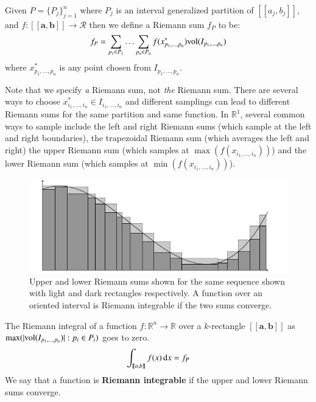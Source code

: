 \begin{definition}
	Given $P=\{ P_j \}_{j=1}^n$ where $P_j$ is an interval generalized partition of $[\![a_j, b_j]\!]$,
	and $f:[\![\boldsymbol{a}, \boldsymbol{b}]\!] \to \mathcal{R}$ then we define a Riemann sum $f_P$ to be:
	\begin{equation}
		f_P = \sum_{p_1 \in P_1} \ldots \sum_{p_n \in P_n} f(x^*_{p_1, \ldots, p_n}) \text{vol}(I_{p_1, \ldots, p_n})
	\end{equation}
	where $x^*_{p_1, \ldots, p_n}$ is any point chosen from $I_{p_1, \ldots, p_n}$.
\end{definition}

Note that we specify \emph{a} Riemann sum, not \emph{the} Riemann sum.
There are several ways to choose $x^*_{i_1,\ldots,i_n} \in I_{i_1, \ldots, i_n}$ and different samplings can lead to different Riemann sums for the same partition and same function.
In $\mathbb{R}^1$, several common ways to sample include the left and right Riemann sums (which sample at the left and right boundaries), the trapezoidal Riemann sum (which averages the left and right) the upper Riemann sum (which samples at $\max(f(x_{i_1, \ldots, i_n}))$) and the lower Riemann sum (which samples at $\min(f(x_{i_1,\ldots,i_n}))$).


\begin{figure}[ht]
\caption[Riemann Integral]{Upper and lower Riemann sums shown for the same sequence shown with light and dark rectangles respectively. A function over an oriented interval is Riemann integrable if the two sums converge.}
\centering
\includegraphics[scale=0.6]{diagrams/riemann}
\end{figure}


\begin{definition}
The Riemann integral of a function $f:\mathbb{R}^n \to \mathbb{R}$ over a $k$-rectangle 
$[\![\boldsymbol{a}, \boldsymbol{b}]\!]$ as $\max( | \text{vol}( I_{p_1,\ldots, p_n}) | : p_i \in P_i )$ goes to zero.
	\begin{equation}
		\int_{[\![a,b]\!]} f(x) \mathop{}\!\mathrm{d} x = f_P
	\end{equation} 
	We say that a function is \textbf{Riemann integrable} if the upper and lower Riemann sums converge.
\end{definition}






